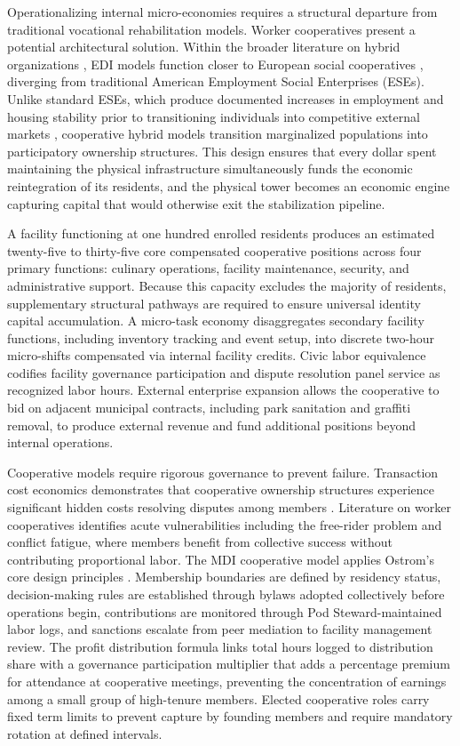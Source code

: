 \documentclass[12pt, letterpaper]{article}
\begin{document}
Operationalizing internal micro-economies requires a structural departure from traditional vocational rehabilitation models. Worker cooperatives present a potential architectural solution. Within the broader literature on hybrid organizations \citep{battilana2014advancing}, EDI models function closer to European social cooperatives \citep{defourny2010conceptions, galera2009social}, diverging from traditional American Employment Social Enterprises (ESEs). Unlike standard ESEs, which produce documented increases in employment and housing stability prior to transitioning individuals into competitive external markets \citep{rotz2015economic}, cooperative hybrid models transition marginalized populations into participatory ownership structures. This design ensures that every dollar spent maintaining the physical infrastructure simultaneously funds the economic reintegration of its residents, and the physical tower becomes an economic engine capturing capital that would otherwise exit the stabilization pipeline.

A facility functioning at one hundred enrolled residents produces an estimated twenty-five to thirty-five core compensated cooperative positions across four primary functions: culinary operations, facility maintenance, security, and administrative support. Because this capacity excludes the majority of residents, supplementary structural pathways are required to ensure universal identity capital accumulation. A micro-task economy disaggregates secondary facility functions, including inventory tracking and event setup, into discrete two-hour micro-shifts compensated via internal facility credits. Civic labor equivalence codifies facility governance participation and dispute resolution panel service as recognized labor hours. External enterprise expansion allows the cooperative to bid on adjacent municipal contracts, including park sanitation and graffiti removal, to produce external revenue and fund additional positions beyond internal operations.

Cooperative models require rigorous governance to prevent failure. Transaction cost economics demonstrates that cooperative ownership structures experience significant hidden costs resolving disputes among members \citep{hansmann1996ownership}. Literature on worker cooperatives identifies acute vulnerabilities including the free-rider problem \citep{olson1965logic} and conflict fatigue, where members benefit from collective success without contributing proportional labor. The MDI cooperative model applies Ostrom's core design principles \citep{ostrom1990governing}. Membership boundaries are defined by residency status, decision-making rules are established through bylaws adopted collectively before operations begin, contributions are monitored through Pod Steward-maintained labor logs, and sanctions escalate from peer mediation to facility management review. The profit distribution formula links total hours logged to distribution share with a governance participation multiplier that adds a percentage premium for attendance at cooperative meetings, preventing the concentration of earnings among a small group of high-tenure members. Elected cooperative roles carry fixed term limits to prevent capture by founding members and require mandatory rotation at defined intervals.
\end{document}
